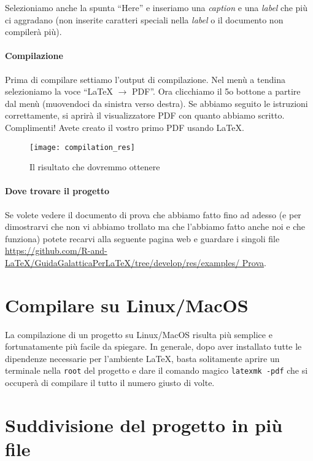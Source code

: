 Selezioniamo anche la spunta ``Here'' e inseriamo una \textit{caption} e una
\textit{label} che più ci aggradano (non inserite caratteri speciali nella
\textit{label} o il documento non compilerà più).

\paragraph*{Compilazione} Prima di compilare settiamo l'output di compilazione.
Nel menù a tendina selezioniamo la voce ``LaTeX $\to$ PDF''. Ora clicchiamo il
5o bottone a partire dal menù (muovendoci da sinistra verso destra). Se abbiamo
seguito le istruzioni correttamente, si aprirà il visualizzatore PDF con quanto
abbiamo scritto. Complimenti! Avete creato il vostro primo PDF usando \LaTeX{}.

\begin{figure}[H]
 \centering
 \texttt{[image: compilation\_res]}
 \caption{Il risultato che dovremmo ottenere}
 \label{img:compilation_res}
\end{figure}

\paragraph*{Dove trovare il progetto} Se volete vedere il documento di prova
che abbiamo fatto fino ad adesso (e per dimostrarvi che non vi abbiamo
trollato ma che l'abbiamo fatto anche noi e che funziona) potete recarvi alla
seguente pagina web e guardare i singoli file
\url{
https://github.com/R-and-LaTeX/GuidaGalatticaPerLaTeX/tree/develop/res/examples/
Prova}.

\newpage

\section{Compilare su Linux/MacOS}

La compilazione di un progetto su Linux/MacOS risulta più semplice e
fortunatamente più facile da spiegare. In generale, dopo aver installato tutte
le dipendenze necessarie per l'ambiente \LaTeX{}, basta solitamente aprire un
terminale nella \texttt{root} del progetto e dare il comando magico
\texttt{latexmk -pdf} che si occuperà di compilare il tutto il numero giusto di
volte.

\section{Suddivisione del progetto in più file}
\label{sec:prog_piu_file}

